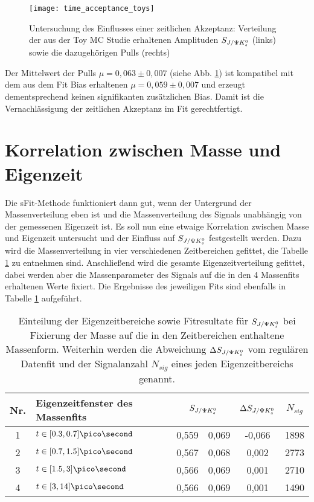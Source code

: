 \begin{figure}[hptb]
\centering
\texttt{[image: time\_acceptance\_toys]}
\caption{Untersuchung des Einflusses einer zeitlichen Akzeptanz: Verteilung der aus der Toy MC Studie erhaltenen Amplituden $S_{J/\Psi K_s^0}$ (links) sowie die dazugehörigen Pulls (rechts)}
\label{fig:toys_acceptance}
\end{figure}

Der Mittelwert der Pulls $\mu = 0,063 \pm 0,007$ (siehe Abb. \ref{fig:toys_acceptance}) ist kompatibel mit dem aus dem Fit Bias erhaltenen $\mu = 0,059 \pm 0,007$ und erzeugt dementsprechend keinen signifikanten zusätzlichen Bias. Damit ist die Vernachlässigung der zeitlichen Akzeptanz im Fit gerechtfertigt.



\section{Korrelation zwischen Masse und Eigenzeit}
Die sFit-Methode funktioniert dann gut, wenn der Untergrund der Massenverteilung eben ist und die Massenverteilung des Signals unabhängig von der gemessenen Eigenzeit ist. Es soll nun eine etwaige Korrelation zwischen Masse und Eigenzeit untersucht und der Einfluss auf $S_{J/\Psi K_s^0}$ festgestellt werden. Dazu wird die Massenverteilung in vier verschiedenen Zeitbereichen gefittet, die Tabelle \ref{tab:mass_ct} zu entnehmen sind. Anschließend wird die gesamte Eigenzeitverteilung gefittet, dabei werden aber die Massenparameter des Signals auf die in den 4 Massenfits erhaltenen Werte fixiert. Die Ergebnisse des jeweiligen Fits sind ebenfalls in Tabelle \ref{tab:mass_ct} aufgeführt.

\begin{table}[hptb]
\centering
\caption{Einteilung der Eigenzeitbereiche sowie Fitresultate für $S_{J/\Psi K_s^0}$ bei Fixierung der Masse auf die in den Zeitbereichen enthaltene Massenform. Weiterhin werden die Abweichung $\Delta S_{J/\Psi K_s^0}$ vom regulären Datenfit und der Signalanzahl $N_{sig}$ eines jeden Eigenzeitbereichs genannt.}
\label{tab:mass_ct}
\begin{tabular}{c l r@{$\pm$}l c c}
\hline \hline
Nr. & Eigenzeitfenster des Massenfits & \multicolumn{2}{c}{$S_{J/\Psi K_s^0}$} & $\Delta S_{J/\Psi K_s^0}$ & $N_{sig}$\\ \hline
1 & $t \in [0.3, 0.7] \pico\second$ & 0,559 & 0,069 & -0,066 & 1898 \\
2 & $t \in [0.7, 1.5] \pico\second$ & 0,567 & 0,068 & 0,002 & 2773 \\
3 & $t \in [1.5, 3] \pico\second$ & 0,566 & 0,069 & 0,001 & 2710 \\
4 & $t \in [3, 14] \pico\second$ & 0,566 & 0,069 & 0,001 & 1490 \\ \hline \hline
\end{tabular}
\end{table}

